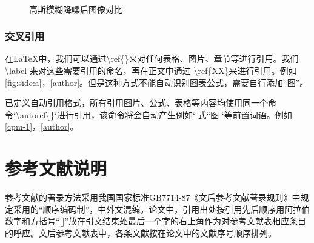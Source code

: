 ﻿\documentclass{scutthesis} %
\begin{document}
\begin{figure}[!htp]
	\centering
	\qquad
	 \\
	\caption{高斯模糊降噪后图像对比}
    \label{cpm-1}
\end{figure}

\subsection{交叉引用}
在\LaTeX 中，我们可以通过\textbackslash ref\{\}来对任何表格、图片、章节等进行引用。我们\textbackslash label 来对这些需要引用的命名，再在正文中通过 \textbackslash ref\{XX\}来进行引用。例如\ref{fig:side:a}，\ref{author}。但是这种方式不能自动识别图表公式，需要自行添加“图”。

已定义自动引用格式，所有引用图片、公式、表格等内容均使用同一个命令`\textbackslash autoref\{\}`进行引用，该命令将会自动产生例如` 式``图 `等前置词语。例如\autoref{cpm-1}，\autoref{author}。
\newpage

\chapter{参考文献说明}
参考文献的著录方法采用我国国家标准GB7714-87《文后参考文献著录规则》中规定采用的“顺序编码制”，中外文混编。论文中，引用出处按引用先后顺序用阿拉伯数字和方括号“[]”放在引文结束处最后一个字的右上角作为对参考文献表相应条目的呼应。文后参考文献表中，各条文献按在论文中的文献序号顺序排列。
\end{document}
